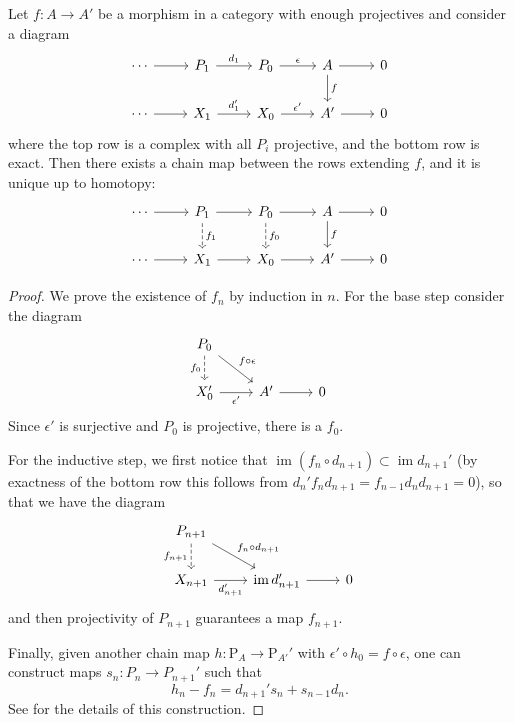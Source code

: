 \documentclass[english,letterpaper]{article}%
\numberwithin{equation}{section}
\numberwithin{figure}{section}
\numberwithin{table}{section}
\theoremstyle{definition}
\theoremstyle{definition}
\theoremstyle{definition}
\theoremstyle{plain}
\theoremstyle{plain}
\theoremstyle{plain}
\theoremstyle{plain}
\theoremstyle{remark}
\theoremstyle{remark}
\newcommand{\bm}[1]{\boldsymbol{\mathrm{#1}}}
\DeclareMathOperator{\im}{im}
\begin{document}
\begin{thm}
    Let $f:A\to A'$ be a morphism in a category with enough projectives and consider a diagram
    \[\begin{tikzcd}
        \cdots\arrow[r] & P_1\arrow[r,"d_1"] & P_0 \arrow[r,"\epsilon"] & A\arrow[d,"f"]\arrow[r] & 0 \\
       \cdots\arrow[r] & X_1\arrow[r,"d_1'"] & X_0\arrow[r,"\epsilon'"] &A' \arrow[r] &0
    \end{tikzcd}\]
    where the top row is a complex with all $P_i$ projective, and the bottom row is exact. Then there exists a chain map between the rows extending $f$, and it is unique up to homotopy:
    \[\begin{tikzcd}
        \cdots\arrow[r] & P_1\arrow[r]\arrow[d,dashed,"f_1"] & P_0 \arrow[r]\arrow[d,dashed,"f_0"] & A\arrow[d,"f"]\arrow[r] & 0 \\
       \cdots\arrow[r] & X_1\arrow[r] & X_0\arrow[r] &A' \arrow[r] &0
    \end{tikzcd}\]
\end{thm}
\begin{proof}
     We prove the existence of $f_n$ by induction in $n$. For the base step consider the diagram
     \[\begin{tikzcd}
        P_0 \ar[d,dashed,swap,"f_0"]\ar[dr,"f\circ\epsilon"] & &\\
        X_0' \ar[r,swap,"\epsilon'"]& A'\ar[r] & 0
     \end{tikzcd}\]
     Since $\epsilon'$ is surjective and $P_0$ is projective, there is a $f_0$.
     
     For the inductive step, we first notice that $\im (f_n\circ d_{n+1})\subset \im d_{n+1}'$ (by exactness of the bottom row this follows from $d_n'f_n d_{n+1}=f_{n-1}d_nd_{n+1}=0$), so that we have the diagram
     \[\begin{tikzcd}
        P_{n+1} \ar[d,dashed,swap,"f_{n+1}"]\ar[dr,"f_n\circ d_{n+1}"] & &\\
        X_{n+1} \ar[r,swap,"d_{n+1}'"]& \im d_{n+1}'\ar[r] & 0
     \end{tikzcd}\]
     and then projectivity of $P_{n+1}$ guarantees a map $f_{n+1}$.
     
     Finally, given another chain map $h:\bm{P}_A\to \bm{P}_{A'}'$ with $\epsilon '\circ h_0=f\circ\epsilon$, one can construct maps $s_n:P_n\to P_{n+1}'$ such that
     \[h_n-f_n=d_{n+1}'s_n+s_{n-1}d_n.\]
     See \cite[Thm. 6.16]{Rotman} for the details of this construction.
\end{proof}
\end{document}
